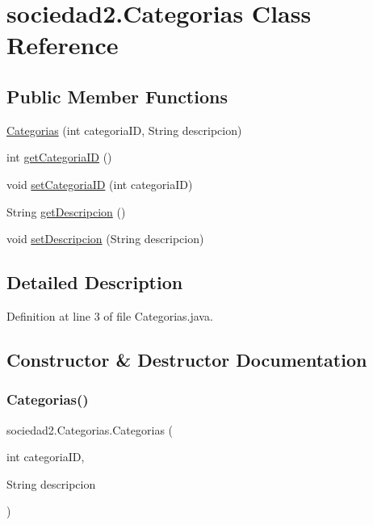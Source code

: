 \hypertarget{classsociedad2_1_1_categorias}{}\section{sociedad2.\+Categorias Class Reference}
\label{classsociedad2_1_1_categorias}
\subsection*{Public Member Functions}
\begin{DoxyCompactItemize}
\item 
\mbox{\hyperlink{classsociedad2_1_1_categorias_a0a706ae880a6344b6be1ca15aece14f5}{Categorias}} (int categoria\+ID, String descripcion)
\item 
int \mbox{\hyperlink{classsociedad2_1_1_categorias_abdec184d09f46ff60c7330ca18c0b137}{get\+Categoria\+ID}} ()
\item 
void \mbox{\hyperlink{classsociedad2_1_1_categorias_a89f27d49411c1937acf22114e58c6ec0}{set\+Categoria\+ID}} (int categoria\+ID)
\item 
String \mbox{\hyperlink{classsociedad2_1_1_categorias_a8902ee8c36a2d43fdbc4988d5afe77ed}{get\+Descripcion}} ()
\item 
void \mbox{\hyperlink{classsociedad2_1_1_categorias_aaf348086b5d36288cae11b38837941f8}{set\+Descripcion}} (String descripcion)
\end{DoxyCompactItemize}


\subsection{Detailed Description}


Definition at line 3 of file Categorias.\+java.



\subsection{Constructor \& Destructor Documentation}
\mbox{\label{classsociedad2_1_1_categorias_a0a706ae880a6344b6be1ca15aece14f5}} 
\subsubsection{\texorpdfstring{Categorias()}{Categorias()}}
{\footnotesize\ttfamily sociedad2.\+Categorias.\+Categorias (\begin{DoxyParamCaption}\item[{int}]{categoria\+ID,  }\item[{String}]{descripcion }\end{DoxyParamCaption})}



